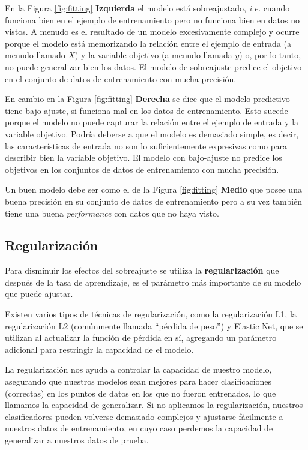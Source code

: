 \documentclass[a4paper,12pt]{article}
\begin{document}
En la Figura \ref{fig:fitting} \textbf{Izquierda} el modelo está sobreajustado, \textit{i.e.} cuando funciona bien en el ejemplo de entrenamiento pero no funciona bien en datos no vistos. A menudo es el resultado de un modelo excesivamente complejo y ocurre porque el modelo está memorizando la relación entre el ejemplo de entrada (a menudo llamado $X$) y la variable objetivo (a menudo llamada $y$) o, por lo tanto, no puede generalizar bien los datos. El modelo de sobreajuste predice el objetivo en el conjunto de datos de entrenamiento con mucha precisión.

En cambio en la Figura \ref{fig:fitting} \textbf{Derecha} se dice que el modelo predictivo tiene bajo-ajuste, si funciona mal en los datos de entrenamiento. Esto sucede porque el modelo no puede capturar la relación entre el ejemplo de entrada y la variable objetivo. Podría deberse a que el modelo es demasiado simple, es decir, las características de entrada no son lo suficientemente expresivas como para describir bien la variable objetivo. El modelo con bajo-ajuste no predice los objetivos en los conjuntos de datos de entrenamiento con mucha precisión.

Un buen modelo debe ser como el de la Figura \ref{fig:fitting} \textbf{Medio} que posee una buena precisión en su conjunto de datos de entrenamiento pero a su vez también tiene una buena \textit{performance} con datos que no haya visto.

\subsection{Regularización}
Para disminuir los efectos del sobreajuste se utiliza la \textbf{regularización} que después de la tasa de aprendizaje, es el parámetro más importante de su modelo que puede ajustar.

Existen varios tipos de técnicas de regularización, como la regularización L1, la regularización L2 (comúnmente llamada “pérdida de peso”) y Elastic Net, que se utilizan al actualizar la función de pérdida en sí, agregando un parámetro adicional para restringir la capacidad de el modelo.

La regularización nos ayuda a controlar la capacidad de nuestro modelo, asegurando que nuestros modelos sean mejores para hacer clasificaciones (correctas) en los puntos de datos en los que no fueron entrenados, lo que llamamos la capacidad de generalizar. Si no aplicamos la regularización, nuestros clasificadores pueden volverse demasiado complejos y ajustarse fácilmente a nuestros datos de entrenamiento, en cuyo caso perdemos la capacidad de generalizar a nuestros datos de prueba.
\end{document}
